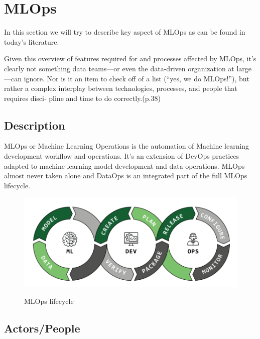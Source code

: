 \section{MLOps}\label{sec:mlops}

In this section we will try to describe key aspect of MLOps as can be found in today's literature.

Given this overview of features required for and processes affected by MLOps, it’s
clearly not something data teams—or even the data-driven organization at large—can
ignore. Nor is it an item to check off of a list (“yes, we do MLOps!”), but rather a
complex interplay between technologies, processes, and people that requires disci‐
pline and time to do correctly.\cite{treveil2020introducing}(p.38)


\subsection{Description}\label{subsec:description}
MLOps or Machine Learning Operations is the automation of Machine learning development workflow and operations.
It's an extension of DevOps practices adapted to machine learning model development and data operations.
MLOps almost never taken alone and DataOps is an integrated part of the full MLOps lifecycle.

\begin{figure}[!htbp]
    \caption{MLOps lifecycle\cite{mlops-definition-tools-and-challenge}}
    \centering
    \includegraphics[scale=0.5]{images/ml-dev-ops}
    \label{fig:ml-dev-ops}
\end{figure}


\subsection{Actors/People}\label{subsec:actors}

